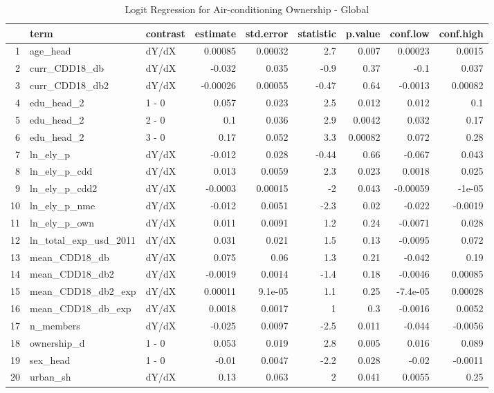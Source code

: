 \begin{table}[htbp]
\centering
\caption{Logit Regression for Air-conditioning Ownership - Global} 
\begin{tabular}{rllrrrrrr}
  \hline
 & term & contrast & estimate & std.error & statistic & p.value & conf.low & conf.high \\ 
  \hline
1 & age\_head & dY/dX & 0.00085 & 0.00032 & 2.7 & 0.007 & 0.00023 & 0.0015 \\ 
  2 & curr\_CDD18\_db & dY/dX & -0.032 & 0.035 & -0.9 & 0.37 & -0.1 & 0.037 \\ 
  3 & curr\_CDD18\_db2 & dY/dX & -0.00026 & 0.00055 & -0.47 & 0.64 & -0.0013 & 0.00082 \\ 
  4 & edu\_head\_2 & 1 - 0 & 0.057 & 0.023 & 2.5 & 0.012 & 0.012 & 0.1 \\ 
  5 & edu\_head\_2 & 2 - 0 & 0.1 & 0.036 & 2.9 & 0.0042 & 0.032 & 0.17 \\ 
  6 & edu\_head\_2 & 3 - 0 & 0.17 & 0.052 & 3.3 & 0.00082 & 0.072 & 0.28 \\ 
  7 & ln\_ely\_p & dY/dX & -0.012 & 0.028 & -0.44 & 0.66 & -0.067 & 0.043 \\ 
  8 & ln\_ely\_p\_cdd & dY/dX & 0.013 & 0.0059 & 2.3 & 0.023 & 0.0018 & 0.025 \\ 
  9 & ln\_ely\_p\_cdd2 & dY/dX & -0.0003 & 0.00015 &  -2 & 0.043 & -0.00059 & -1e-05 \\ 
  10 & ln\_ely\_p\_nme & dY/dX & -0.012 & 0.0051 & -2.3 & 0.02 & -0.022 & -0.0019 \\ 
  11 & ln\_ely\_p\_own & dY/dX & 0.011 & 0.0091 & 1.2 & 0.24 & -0.0071 & 0.028 \\ 
  12 & ln\_total\_exp\_usd\_2011 & dY/dX & 0.031 & 0.021 & 1.5 & 0.13 & -0.0095 & 0.072 \\ 
  13 & mean\_CDD18\_db & dY/dX & 0.075 & 0.06 & 1.3 & 0.21 & -0.042 & 0.19 \\ 
  14 & mean\_CDD18\_db2 & dY/dX & -0.0019 & 0.0014 & -1.4 & 0.18 & -0.0046 & 0.00085 \\ 
  15 & mean\_CDD18\_db2\_exp & dY/dX & 0.00011 & 9.1e-05 & 1.1 & 0.25 & -7.4e-05 & 0.00028 \\ 
  16 & mean\_CDD18\_db\_exp & dY/dX & 0.0018 & 0.0017 &   1 & 0.3 & -0.0016 & 0.0052 \\ 
  17 & n\_members & dY/dX & -0.025 & 0.0097 & -2.5 & 0.011 & -0.044 & -0.0056 \\ 
  18 & ownership\_d & 1 - 0 & 0.053 & 0.019 & 2.8 & 0.005 & 0.016 & 0.089 \\ 
  19 & sex\_head & 1 - 0 & -0.01 & 0.0047 & -2.2 & 0.028 & -0.02 & -0.0011 \\ 
  20 & urban\_sh & dY/dX & 0.13 & 0.063 &   2 & 0.041 & 0.0055 & 0.25 \\ 
   \hline
\end{tabular}
\end{table}

